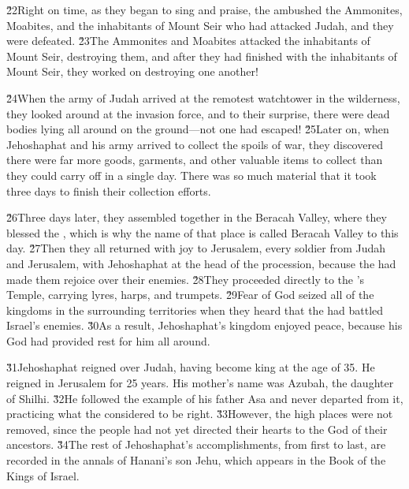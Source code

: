 \v{22}Right on time, as they began to sing and praise, the  ambushed the Ammonites, Moabites, and the inhabitants of Mount Seir who had attacked Judah, and they were defeated. \v{23}The Ammonites and Moabites attacked the inhabitants of Mount Seir, destroying them, and after they had finished with the inhabitants of Mount Seir, they worked on destroying one another!

\v{24}When the army of Judah arrived at the remotest watchtower in the wilderness, they looked around at the invasion force, and to their surprise, there were dead bodies lying all around on the ground---not one had escaped! \v{25}Later on, when Jehoshaphat and his army arrived to collect the spoils of war, they discovered there were far more goods, garments, and other valuable items to collect than they could carry off in a single day. There was so much material that it took three days to finish their collection efforts.

\v{26}Three days later, they assembled together in the Beracah Valley, where they blessed the , which is why the name of that place is called Beracah Valley to this day. \v{27}Then they all returned with joy to Jerusalem, every soldier from Judah and Jerusalem, with Jehoshaphat at the head of the procession, because the  had made them rejoice over their enemies. \v{28}They proceeded directly to the 's Temple, carrying lyres, harps, and trumpets. \v{29}Fear of God seized all of the kingdoms in the surrounding territories when they heard that the  had battled Israel's enemies. \v{30}As a result, Jehoshaphat's kingdom enjoyed peace, because his God had provided rest for him all around.

\v{31}Jehoshaphat reigned over Judah, having become king at the age of 35. He reigned in Jerusalem for 25 years. His mother's name was Azubah, the daughter of Shilhi. \v{32}He followed the example of his father Asa and never departed from it, practicing what the  considered to be right. \v{33}However, the high places were not removed, since the people had not yet directed their hearts to the God of their ancestors. \v{34}The rest of Jehoshaphat's accomplishments, from first to last, are recorded in the annals of Hanani's son Jehu, which appears in the Book of the Kings of Israel.

